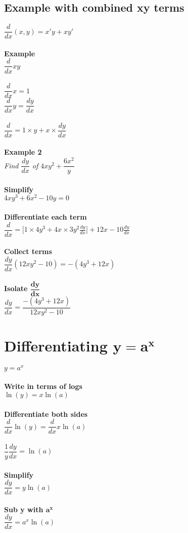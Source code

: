 \documentclass{article}[18pt]
\begin{document}
\subsection{Example with combined xy terms}
$\dfrac{d}{dx}(x,y)=x'y+xy'$\\
\\
\textbf{Example}
\\
$\dfrac{d}{dx}xy$\\
\\
$\dfrac{d}{dx}x=1$\\
$\dfrac{d}{dx}y=\dfrac{dy}{dx}$\\
\\
$\dfrac{d}{dx}=1\times y+x\times\dfrac{dy}{dx}$\\
\\
\textbf{Example 2}\\
\textit{Find $\dfrac{dy}{dx}$ of $4xy^2+\dfrac{6x^2}{y}$}\\
\\
\textbf{Simplify}\\
$4xy^3+6x^2-10y=0$\\
\\
\textbf{Differentiate each term}\\
$\dfrac{d}{dx}=\bigg[1\times4y^3+4x\times3y^2\frac{dy}{dx}\bigg]+12x-10\frac{dy}{dx}$\\
\\
\textbf{Collect terms}\\
$\dfrac{dy}{dx}(12xy^2-10)=-(4y^3+12x)$\\
\\
\textbf{Isolate $\mathbf{\dfrac{dy}{dx}}$}\\
$\dfrac{dy}{dx}=\dfrac{-(4y^3+12x)}{12xy^2-10}$
\section{Differentiating $\mathbf{y=a^x}$}
$y=a^x$\\
\\
\textbf{Write in terms of logs}\\
$\ln(y)=x\ln(a)$\\
\\
\textbf{Differentiate both sides}\\
$\dfrac{d}{dx}\ln(y)=\dfrac{d}{dx}x\ln(a)$\\
\\
$\dfrac{1}{y}\dfrac{dy}{dx}=\ln(a)$\\
\\
\textbf{Simplify}\\
$\dfrac{dy}{dx}=y\ln(a)$\\
\\
\textbf{Sub y with $\mathbf{a^x}$}\\
$\dfrac{dy}{dx}=a^x\ln(a)$\\
\end{document}
